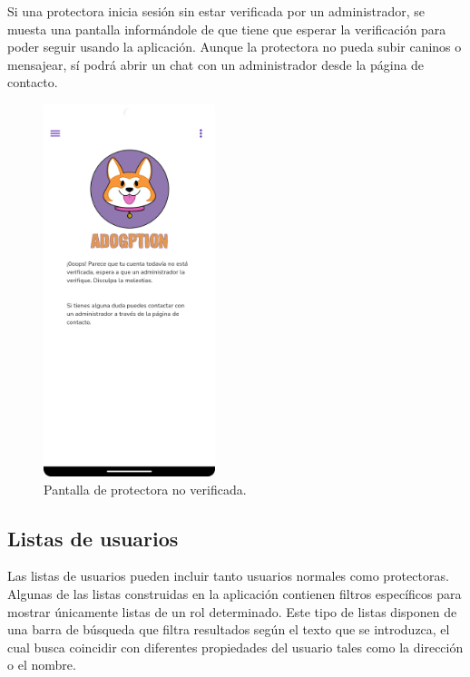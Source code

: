 \documentclass[a4paper, 12pt]{article}
\begin{document}
Si una protectora inicia sesión sin estar verificada por un administrador, se muesta una pantalla informándole de que tiene que esperar la verificación para poder seguir usando la aplicación. Aunque la protectora no pueda subir caninos o mensajear, sí podrá abrir un chat con un administrador desde la página de contacto.


\begin{figure}[H]
	\begin{center}
		{\includegraphics[width=5cm]{app/UnverifiedPage.png}\par}
		\caption{Pantalla de protectora no verificada.}
	\end{center}  
\end{figure}



\newpage
\subsection*{Listas de usuarios}

Las listas de usuarios pueden incluir tanto usuarios normales como protectoras. Algunas de las listas construidas en la aplicación contienen filtros específicos para mostrar únicamente listas de un rol determinado. Este tipo de listas disponen de una barra de búsqueda que filtra resultados según el texto que se introduzca, el cual busca coincidir con diferentes propiedades del usuario tales como la dirección o el nombre. 
\end{document}
